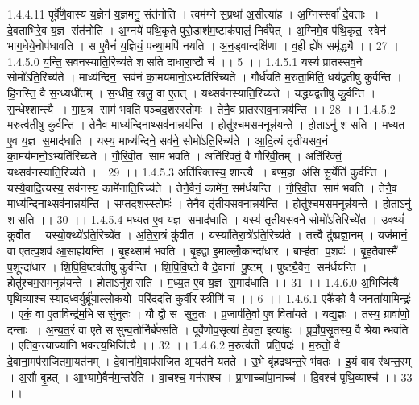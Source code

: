 1.4.4.11
पूर्वे॑णै॒वास्य॑ य॒ज्ञेन॑ य॒ज्ञमनु॒ संत॑नोति । त्वम॑ग्ने स॒प्रथा॑ अ॒सीत्या॑ह । अ॒ग्निस्सर्वा॑ दे॒वताः । दे॒वता॑भिरे॒व य॒ज्ञ संत॑नोति । अ॒ग्नये॑ पथि॒कृते॑ पुरो॒डाश॑म॒ष्टाक॑पालं॒ निर्व॑पेत् । अ॒ग्निमे॒व प॑थि॒कृत॒॒ स्वेन॑ भाग॒धेये॒नोप॑धावति । स ए॒वैनं॑ य॒ज्ञियं॒ पन्था॒मपि॑ नयति । अ॒न॒ड्वान्दक्षि॑णा । व॒ही ह्ये॑ष समृ॑द्ध्यै ।। 27 ।।
1.4.5.0
य॒न्ति॒ सव॑नस्याति॒रिच्य॑ते शसति दाधारा॒ष्टौ च॑ ।। 5 ।।
1.4.5.1
यस्य॑ प्रातस्सव॒ने सोमो॑ऽति॒रिच्य॑ते । माध्य॑न्दिन॒॒ सव॑नं का॒मय॑मानो॒ऽभ्यति॑रिच्यते । गौर्ध॑यति म॒रुता॒मिति॒ धय॑द्वतीषु कुर्वन्ति । हि॒नस्ति॒ वै स॒न्ध्यधी॑तम् । स॒न्धीव॒ खलु॒ वा ए॒तत् । यथ्सव॑नस्याति॒रिच्य॑ते । यद्धय॑द्वतीषु कु॒र्वन्ति॑ । स॒न्धेश्शान्त्यै । गा॒य॒त्र साम॑ भवति पञ्चद॒शस्स्तोमः॑ । तेनै॒व प्रा॑तस्सव॒नान्नय॑न्ति ।। 28 ।।
1.4.5.2
म॒रुत्व॑तीषु कुर्वन्ति । तेनै॒व माध्य॑न्दिना॒थ्सव॑ना॒न्नय॑न्ति । होतु॑श्चम॒समनून्न॑यन्ते । होताऽनु॑ शसति । म॒ध्य॒त ए॒व य॒ज्ञ स॒माद॑धाति । यस्य॒ माध्य॑न्दिने॒ सव॑ने॒ सोमो॑ऽति॒रिच्य॑ते । आ॒दि॒त्यं तृ॑तीयसव॒नं का॒मय॑मानो॒ऽभ्यति॑रिच्यते । गौ॒रि॒वी॒त साम॑ भवति । अति॑रिक्तं॒ वै गौ॑रिवी॒तम् । अति॑रिक्तं॒ यथ्सव॑नस्याति॒रिच्य॑ते ।। 29 ।।
1.4.5.3
अति॑रिक्तस्य॒ शान्त्यै । बण्म॒हा अ॑सि सू॒र्येति॑ कुर्वन्ति । यस्यै॒वादि॒त्यस्य॒ सव॑नस्य॒ कामे॑नाति॒रिच्य॑ते । तेनै॒वैनं॒ कामे॑न॒ सम॑र्धयन्ति । गौ॒रि॒वी॒त साम॑ भवति । तेनै॒व माध्य॑न्दिना॒थ्सव॑ना॒न्नय॑न्ति । स॒प्त॒द॒शस्स्तोमः॑ । तेनै॒व तृ॑तीयसव॒नान्नय॑न्ति । होतु॑श्चम॒समनून्न॑यन्ते । होताऽनु॑ शसति ।। 30 ।।
1.4.5.4
म॒ध्य॒त ए॒व य॒ज्ञ स॒माद॑धाति । यस्य॑ तृतीयसव॒ने सोमो॑ऽति॒रिच्ये॑त । उ॒क्थ्यं॑ कुर्वीत । यस्यो॒क्थ्ये॑ऽति॒रिच्ये॑त । अ॒ति॒रा॒त्रं कु॑र्वीत । यस्या॑तिरा॒त्रे॑ऽति॒रिच्य॑ते । तत्त्वै दु॑ष्प्रज्ञा॒नम् । यज॑मानं॒ वा ए॒तत्प॒शव॑ आ॒साह्य॑यन्ति । बृ॒हथ्साम॑ भवति । बृ॒हद्वा इ॒माल्लोँ॒कान्दा॑धार । बाऱ्ह॑ता प॒शवः॑ । बृ॒ह॒तैवास्मै॑ प॒शून्दा॑धार । शि॒पि॒वि॒ष्टव॑तीषु कुर्वन्ति । शि॒पि॒वि॒ष्टो वै दे॒वानां पु॒ष्टम् । पुष्ट्यै॒वैन॒॒ सम॑र्धयन्ति । होतु॑श्चम॒समनून्न॑यन्ते । होताऽनु॑शसति । म॒ध्य॒त ए॒व य॒ज्ञ स॒माद॑धाति ।। 31 ।।
1.4.6.0
अ॒भिजि॑त्यै पृथि॒व्याश्च॒ स्याद॑ध्व॒र्युर्ब्रू॑याल्लो॒कयो॒ परि॑ददति कुर्वीर॒॒स्त्रीणि॑ च ।। 6 ।।
1.4.6.1
एकै॑को॒ वै ज॒नता॑या॒मिन्द्रः॑ । एकं॒ वा ए॒ताविन्द्र॑म॒भि ससु॑नुतः । यौ द्वौ स॑ सुनु॒तः । प्र॒जाप॑ति॒र्वा ए॒ष विता॑यते । यद्य॒ज्ञः । तस्य॒ ग्रावा॑णो॒ दन्ताः । अ॒न्य॒त॒रं वा ए॒ते स॑सुन्व॒तोर्निर्ब॑फ्सति । पूर्वे॑णोप॒सृत्या॑ दे॒वता॒ इत्या॑हुः । पू॒र्वो॒प॒सृ॒तस्य॒ वै श्रेयान्भवति । एति॑व॒न्त्याज्या॑नि भवन्त्य॒भिजि॑त्यै ।। 32 ।।
1.4.6.2
म॒रुत्व॑ती प्रति॒पदः॑ । म॒रुतो॒ वै दे॒वाना॒मप॑राजितमा॒यत॑नम् । दे॒वाना॑मे॒वाप॑राजित आ॒यत॑ने यतते । उ॒भे बृ॑हद्रथन्त॒रे भ॑वतः । इ॒यं वाव र॑थन्त॒रम् । अ॒सौ बृ॒हत् । आ॒भ्यामे॒वैन॑म॒न्तरे॑ति । वा॒चश्च॒ मन॑सश्च । प्रा॒णाच्चा॑पा॒नाच्च॑ । दि॒वश्च॑ पृथि॒व्याश्च॑ ।। 33 ।।
